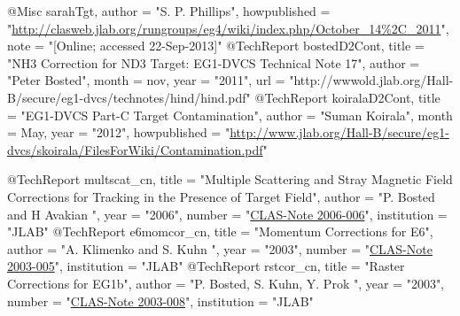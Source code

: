 @Misc{ sarahTgt,
  author = "S. P. Phillips",
  howpublished = "\url{http://clasweb.jlab.org/rungroups/eg4/wiki/index.php/October\_14\%2C\_2011}", 
  note = "[Online; accessed 22-Sep-2013]"
} 
@TechReport{ bostedD2Cont,
	title = "NH3 Correction for ND3 Target: EG1-DVCS Technical Note 17",
	author = "Peter Bosted",
	month = nov,
	year = "2011",
	url = "http://wwwold.jlab.org/Hall-B/secure/eg1-dvcs/technotes/hind/hind.pdf"
}
@TechReport{ koiralaD2Cont,
	title = "{EG1-DVCS Part-C Target Contamination}",
	author = "Suman Koirala",
	month = May,
	year = "2012",
	howpublished = "\url{http://www.jlab.org/Hall-B/secure/eg1-dvcs/skoirala/FilesForWiki/Contamination.pdf}"
}




@TechReport{ multscat_cn,
	title = "Multiple Scattering and Stray Magnetic Field Corrections for Tracking in the Presence of Target Field",
	author = "{P. Bosted and H Avakian }",
	year = "2006",
	number = "\href{https://misportal.jlab.org/ul/physics/hall-b/clas/viewFile.cfm/2006-006.pdf?documentId=260}{CLAS-Note 2006-006}",
	institution = "JLAB"
} 
@TechReport{ e6momcor_cn,
	title = "{Momentum Corrections for E6}",
	author = "{A. Klimenko and S. Kuhn }",
	year = "2003",
	number = "\href{http://www.jlab.org/Hall-B/notes/clas_notes03/03-005.pdf}{CLAS-Note 2003-005}",
	institution = "JLAB"
}
@TechReport{ rstcor_cn,
	title = "Raster Corrections for EG1b",
	author = "{P. Bosted, S. Kuhn, Y. Prok }",
	year = "2003",
	number = "\href{http://www.jlab.org/Hall-B/notes/clas_notes03/03-008.pdf}{CLAS-Note 2003-008}",
	institution = "JLAB"
}


